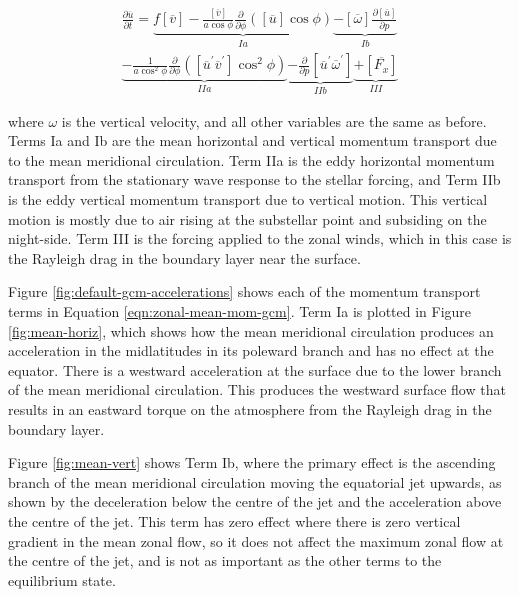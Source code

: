\begin{equation}\label{eqn:zonal-mean-mom-gcm}
  \begin{split}
    \frac{\partial \overline{u}}{\partial t} = \underbrace{f[\overline{v}]-\frac{[\overline{v}]}{a \cos \phi} \frac{\partial}{\partial \phi}([\overline{u}] \cos \phi)}_{Ia}
    \underbrace{-[\overline{\omega}] \frac{\partial[\overline{u}]}{\partial p}}_{Ib} \\
    \underbrace{-\frac{1}{a \cos ^{2} \phi} \frac{\partial}{\partial \phi}\left(\left[\overline{u}^{\prime} \overline{v}^{\prime}\right] \cos ^{2} \phi\right)}_{IIa}
    \underbrace{-\frac{\partial}{\partial p}\left[\overline{u}^{\prime} \overline{\omega}^{\prime}\right]}_{IIb}
    \underbrace{+\left[\overline{F_{x}}\right]}_{III} \end{split}
\end{equation}

where $\omega$ is the vertical velocity, and all other variables are the same as before. Terms Ia and Ib are the mean horizontal and vertical momentum transport due to the mean meridional circulation. Term IIa is the eddy horizontal momentum transport from the stationary wave response to the stellar forcing, and Term IIb is the eddy vertical momentum transport due to vertical motion. This vertical motion is mostly due to air rising at the substellar point and subsiding on the night-side. Term III is the forcing applied to the zonal winds, which in this case is the Rayleigh drag in the boundary layer near the surface.

Figure \ref{fig:default-gcm-accelerations} shows each of the momentum transport terms in Equation \ref{eqn:zonal-mean-mom-gcm}. Term Ia is plotted in Figure \ref{fig:mean-horiz}, which shows how the mean meridional circulation produces an acceleration in the midlatitudes in its poleward branch and has no effect at the equator. There is a westward acceleration at the surface due to the lower branch of the mean meridional circulation. This produces the westward surface flow that results in an eastward torque on the atmosphere from the Rayleigh drag in the boundary layer.

Figure \ref{fig:mean-vert} shows Term Ib, where the primary effect is the ascending branch of the mean meridional circulation moving the equatorial jet upwards, as shown by the deceleration below the centre of the jet and the acceleration above the centre of the jet. This term has zero effect where there is zero vertical gradient in the mean zonal flow, so it does not affect the maximum zonal flow at the centre of the jet, and is not as important as the other terms to the equilibrium state.

